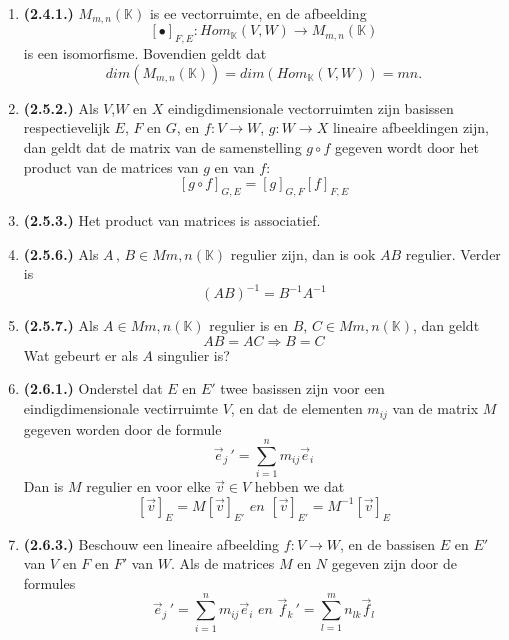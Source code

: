 \documentclass[12pt]{article}
\begin{document}
\begin{enumerate}
        \item \textbf{(2.4.1.)} $M_{m,n}(\mathbb{K})$ is ee vectorruimte, en de afbeelding $$[\bullet]_{F,E}: Hom_{\mathbb{K}}(V,W) \rightarrow M_{m,n}(\mathbb{K})$$ is een isomorfisme. Bovendien geldt dat $$dim(M_{m,n}(\mathbb{K})) = dim(Hom_{\mathbb{K}}(V,W))=mn.$$ 
        \item \textbf{(2.5.2.)} Als $V$,$W$ en $X$ eindigdimensionale vectorruimten zijn basissen respectievelijk $E$, $F$ en $G$, en $f:V \rightarrow W$, $g:W \rightarrow X$ lineaire afbeeldingen zijn, dan geldt dat de matrix van de samenstelling $g \circ f$ gegeven wordt door het product van de matrices van $g$ en van $f$: $$[g \circ f]_{G,E} = [g]_{G,F}[f]_{F,E}$$
        \item \textbf{(2.5.3.)} Het product van matrices is associatief.
        \item \textbf{(2.5.6.)} Als $A\, , \, B \in M{m,n}(\mathbb{K})$ regulier zijn, dan is ook $AB$ regulier. Verder is $$(AB)^{-1} = B^{-1}A^{-1}$$
        \item \textbf{(2.5.7.)} Als $A \in M{m,n}(\mathbb{K})$ regulier is en $B$, $C \in M{m,n}(\mathbb{K})$, dan geldt $$AB=AC \Rightarrow B=C$$ Wat gebeurt er als $A$ singulier is?
        \item \textbf{(2.6.1.)} Onderstel dat $E$ en $E'$ twee basissen zijn voor een eindigdimensionale vectirruimte $V$, en dat de elementen $m_{ij}$ van de matrix $M$ gegeven worden door de formule $$\vec{e}_j\,' = \sum^n_{i=1} m_{ij}\vec{e}_i$$ Dan is $M$ regulier en voor elke $\vec{v}\in V$ hebben we dat $$[\vec{v}]_E = M[\vec{v}]_{E'} \,\, en \,\, [\vec{v}]_{E'}= M^{-1}[\vec{v}]_E$$
        \item \textbf{(2.6.3.)} Beschouw een lineaire afbeelding $f:V \rightarrow W$, en de bassisen $E$ en $E'$ van $V$ en $F$ en $F'$ van $W$. Als de matrices $M$ en $N$ gegeven zijn door de formules $$\vec{e}_j\,' = \sum^n_{i=1} m_{ij}\vec{e}_i \,\, en \,\, \vec{f}_k\,' = \sum^m_{l=1} n_{lk}\vec{f}_l$$
        

\end{enumerate}
\end{document}

